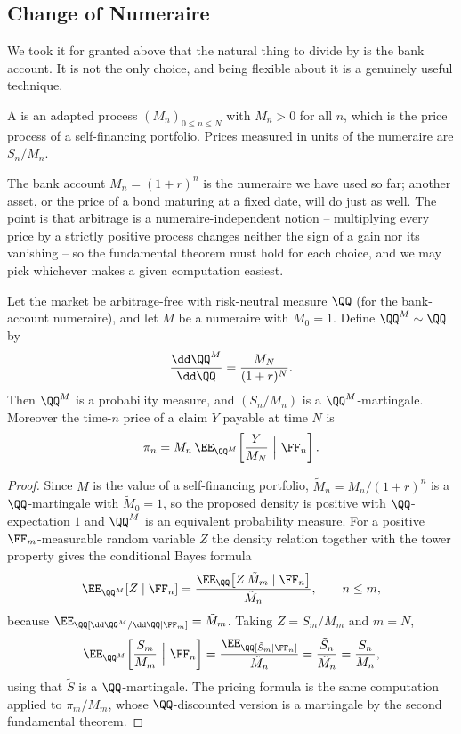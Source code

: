 \subsection{Change of Numeraire}

We took it for granted above that the natural thing to divide by is the bank account. It is not the only choice, and being flexible about it is a genuinely useful technique.

\begin{definition}[Numeraire]
	A  is an adapted process $(M_n)_{0\leq n\leq N}$ with $M_n > 0$ for all $n$, which is the price process of a self-financing portfolio. Prices measured in units of the numeraire are $S_n/M_n$.
\end{definition}

The bank account $M_n = (1+r)^n$ is the numeraire we have used so far; another asset, or the price of a bond maturing at a fixed date, will do just as well. The point is that arbitrage is a numeraire-independent notion -- multiplying every price by a strictly positive process changes neither the sign of a gain nor its vanishing -- so the fundamental theorem must hold for each choice, and we may pick whichever makes a given computation easiest.

\begin{theorem}\label{thm:numeraire}
	Let the market be arbitrage-free with risk-neutral measure $\QQ$ (for the bank-account numeraire), and let $M$ be a numeraire with $M_0 = 1$. Define $\QQ^M \sim \QQ$ by
	$$
	\frac{\dd\QQ^M}{\dd\QQ} = \frac{M_N}{(1+r)^{N}}.
	$$
	Then $\QQ^M$ is a probability measure, and $(S_n/M_n)$ is a $\QQ^M$-martingale. Moreover the time-$n$ price of a claim $Y$ payable at time $N$ is
	$$
	\pi_n = M_n\,\EE_{\QQ^M}\!\left[\frac{Y}{M_N}\ \Big|\ \FF_n\right].
	$$
\end{theorem}

\begin{proof}
	Since $M$ is the value of a self-financing portfolio, $\tilde M_n = M_n/(1+r)^n$ is a $\QQ$-martingale with $\tilde M_0 = 1$, so the proposed density is positive with $\QQ$-expectation $1$ and $\QQ^M$ is an equivalent probability measure. For a positive $\FF_m$-measurable random variable $Z$ the density relation together with the tower property gives the conditional Bayes formula
	$$
	\EE_{\QQ^M}[Z \mid \FF_n] = \frac{\EE_\QQ\big[Z\,\tilde M_m\mid\FF_n\big]}{\tilde M_n}, \qquad n \leq m,
	$$
	because $\EE_\QQ[\dd\QQ^M/\dd\QQ \mid \FF_m] = \tilde M_m$. Taking $Z = S_m/M_m$ and $m = N$,
	$$
	\EE_{\QQ^M}\!\left[\frac{S_m}{M_m}\ \Big|\ \FF_n\right] = \frac{\EE_\QQ[\tilde S_m\mid\FF_n]}{\tilde M_n} = \frac{\tilde S_n}{\tilde M_n} = \frac{S_n}{M_n},
	$$
	using that $\tilde S$ is a $\QQ$-martingale. The pricing formula is the same computation applied to $\pi_m/M_m$, whose $\QQ$-discounted version is a martingale by the second fundamental theorem.
\end{proof}

